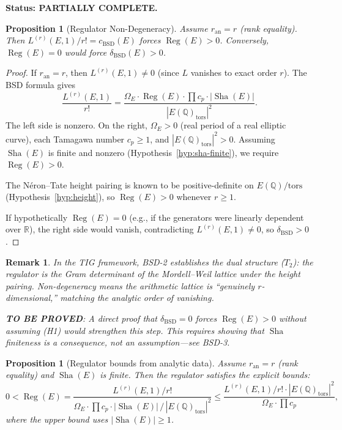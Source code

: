 \documentclass[11pt]{article}
\newtheorem{proposition}[theorem]{Proposition}
\newtheorem{remark}[theorem]{Remark}
\DeclareMathOperator{\Reg}{Reg}
\DeclareMathOperator{\Sha}{Sha}
\begin{document}
\textbf{Status: PARTIALLY COMPLETE.}

\begin{proposition}[Regulator Non-Degeneracy]
\label{prop:bsd2}
Assume $r_{\mathrm{an}} = r$ (rank equality).  Then $L^{(r)}(E,1)/r! =
c_{\mathrm{BSD}}(E)$ forces $\Reg(E) > 0$.  Conversely, $\Reg(E) = 0$ would
force $\delta_{\mathrm{BSD}}(E) > 0$.
\end{proposition}

\begin{proof}
If $r_{\mathrm{an}} = r$, then $L^{(r)}(E,1) \neq 0$ (since $L$ vanishes to
exact order $r$).  The BSD formula gives
\[
  \frac{L^{(r)}(E,1)}{r!} =
  \frac{\Omega_E \cdot \Reg(E) \cdot \prod c_p \cdot |\Sha(E)|}
       {|E(\mathbb{Q})_{\mathrm{tors}}|^2}.
\]
The left side is nonzero.  On the right, $\Omega_E > 0$ (real period of a real
elliptic curve), each Tamagawa number $c_p \geq 1$, and
$|E(\mathbb{Q})_{\mathrm{tors}}|^2 > 0$.  Assuming $\Sha(E)$ is finite and
nonzero (Hypothesis~\ref{hyp:sha-finite}), we require $\Reg(E) > 0$.

The N\'eron--Tate height pairing is known to be positive-definite on
$E(\mathbb{Q})/\mathrm{tors}$ (Hypothesis~\ref{hyp:height}), so
$\Reg(E) > 0$ whenever $r \geq 1$.

If hypothetically $\Reg(E) = 0$ (e.g., if the generators were linearly
dependent over $\mathbb{R}$), the right side would vanish, contradicting
$L^{(r)}(E,1) \neq 0$, so $\delta_{\mathrm{BSD}} > 0$.
\end{proof}

\begin{remark}
In the TIG framework, BSD-2 establishes the \emph{dual structure} ($T_2$): the
regulator is the Gram determinant of the Mordell--Weil lattice under the height
pairing.  Non-degeneracy means the arithmetic lattice is ``genuinely
$r$-dimensional,'' matching the analytic order of vanishing.

\textbf{TO BE PROVED}: A direct proof that $\delta_{\mathrm{BSD}} = 0$ forces
$\Reg(E) > 0$ without assuming (H1) would strengthen this step.  This requires
showing that $\Sha$ finiteness is a consequence, not an assumption---see BSD-3.
\end{remark}

\begin{proposition}[Regulator bounds from analytic data]
\label{prop:reg-bounds}
Assume $r_{\mathrm{an}} = r$ (rank equality) and $\Sha(E)$ is finite.  Then
the regulator satisfies the explicit bounds:
\[
  0 < \Reg(E) =
  \frac{L^{(r)}(E,1)/r!}
       {\Omega_E \cdot \prod c_p \cdot |\Sha(E)| \,/\,
        |E(\mathbb{Q})_{\mathrm{tors}}|^2}
  \leq \frac{L^{(r)}(E,1)/r! \cdot |E(\mathbb{Q})_{\mathrm{tors}}|^2}
       {\Omega_E \cdot \prod c_p},
\]
where the upper bound uses $|\Sha(E)| \geq 1$.
\end{proposition}
\end{document}
